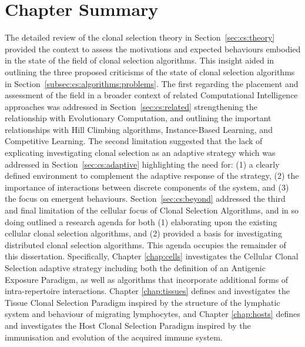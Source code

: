 \section{Chapter Summary}
\label{sec:cs:summary}
The detailed review of the clonal selection theory in Section~\ref{sec:cs:theory} provided the context to assess the motivations and expected behaviours embodied in the state of the field of clonal selection algorithms. 
This insight aided in outlining the three proposed criticisms of the state of clonal selection algorithms in Section~\ref{subsec:cs:algorithms:problems}. 
The first regarding the placement and assessment of the field in a broader context of related Computational Intelligence approaches was addressed in Section~\ref{sec:cs:related} strengthening the relationship with Evolutionary Computation, and outlining the important relationships with Hill Climbing algorithms, Instance-Based Learning, and Competitive Learning.
The second limitation suggested that the lack of explicating investigating clonal selection as an adaptive strategy which was addressed in Section~\ref{sec:cs:adaptive} highlighting the need for: (1) a clearly defined environment to complement the adaptive response of the strategy, (2) the importance of interactions between discrete components of the system, and (3) the focus on emergent behaviours.
Section~\ref{sec:cs:beyond} addressed the third and final limitation of the cellular focus of Clonal Selection Algorithms, and in so doing outlined a research agenda for both (1) elaborating upon the existing cellular clonal selection algorithms, and (2) provided a basis for investigating distributed clonal selection algorithms. 
This agenda occupies the remainder of this dissertation. Specifically, Chapter \ref{chap:cells} investigates the Cellular Clonal Selection adaptive strategy including both the definition of an Antigenic Exposure Paradigm, as well as algorithms that incorporate additional forms of intra-repertoire interactions. Chapter \ref{chap:tissues} defines and investigates the Tissue Clonal Selection Paradigm inspired by the structure of the lymphatic system and behaviour of migrating lymphocytes, and Chapter \ref{chap:hosts} defines and investigates the Host Clonal Selection Paradigm inspired by the immunisation and evolution of the acquired immune system.

